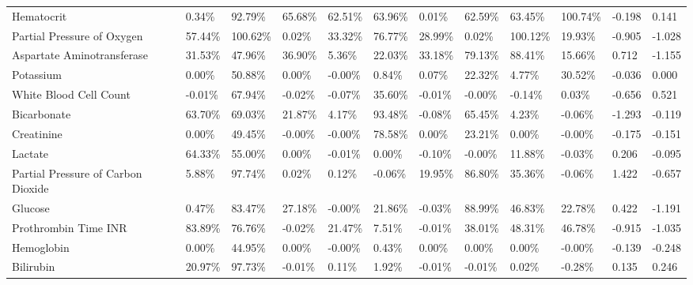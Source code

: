 \begin{tabular}{llllllllllll}
Hematocrit & 0.34\% & 92.79\% & 65.68\% & 62.51\% & 63.96\% & 0.01\% & 62.59\% & 63.45\% & 100.74\% & -0.198 & 0.141 \\
Partial Pressure of Oxygen & 57.44\% & 100.62\% & 0.02\% & 33.32\% & 76.77\% & 28.99\% & 0.02\% & 100.12\% & 19.93\% & -0.905 & -1.028 \\
Aspartate Aminotransferase & 31.53\% & 47.96\% & 36.90\% & 5.36\% & 22.03\% & 33.18\% & 79.13\% & 88.41\% & 15.66\% & 0.712 & -1.155 \\
Potassium & 0.00\% & 50.88\% & 0.00\% & -0.00\% & 0.84\% & 0.07\% & 22.32\% & 4.77\% & 30.52\% & -0.036 & 0.000 \\
White Blood Cell Count & -0.01\% & 67.94\% & -0.02\% & -0.07\% & 35.60\% & -0.01\% & -0.00\% & -0.14\% & 0.03\% & -0.656 & 0.521 \\
Bicarbonate & 63.70\% & 69.03\% & 21.87\% & 4.17\% & 93.48\% & -0.08\% & 65.45\% & 4.23\% & -0.06\% & -1.293 & -0.119 \\
Creatinine & 0.00\% & 49.45\% & -0.00\% & -0.00\% & 78.58\% & 0.00\% & 23.21\% & 0.00\% & -0.00\% & -0.175 & -0.151 \\
Lactate & 64.33\% & 55.00\% & 0.00\% & -0.01\% & 0.00\% & -0.10\% & -0.00\% & 11.88\% & -0.03\% & 0.206 & -0.095 \\
Partial Pressure of Carbon Dioxide & 5.88\% & 97.74\% & 0.02\% & 0.12\% & -0.06\% & 19.95\% & 86.80\% & 35.36\% & -0.06\% & 1.422 & -0.657 \\
Glucose & 0.47\% & 83.47\% & 27.18\% & -0.00\% & 21.86\% & -0.03\% & 88.99\% & 46.83\% & 22.78\% & 0.422 & -1.191 \\
Prothrombin Time INR & 83.89\% & 76.76\% & -0.02\% & 21.47\% & 7.51\% & -0.01\% & 38.01\% & 48.31\% & 46.78\% & -0.915 & -1.035 \\
Hemoglobin & 0.00\% & 44.95\% & 0.00\% & -0.00\% & 0.43\% & 0.00\% & 0.00\% & 0.00\% & -0.00\% & -0.139 & -0.248 \\
Bilirubin & 20.97\% & 97.73\% & -0.01\% & 0.11\% & 1.92\% & -0.01\% & -0.01\% & 0.02\% & -0.28\% & 0.135 & 0.246 \\
\bottomrule
\end{tabular}
